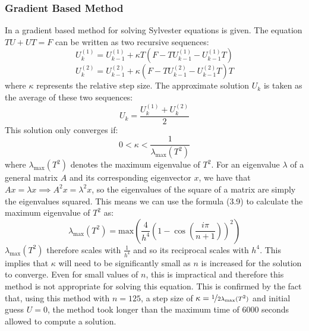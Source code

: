 \documentclass[11pt]{article}
\numberwithin{equation}{section}
\begin{document}
\subsubsection{Gradient Based Method}
In \cite{Zhou} a gradient based method for solving Sylvester equations is given. The equation $TU + UT = F$ can be written as two recursive sequences:
	\begin{equation}
	U_k^{(1)} = U_{k-1}^{(1)} + \kappa T(F-TU_{k-1}^{(1)} - U_{k-1}^{(1)}T)
	\end{equation}
	\begin{equation}
	U_k^{(2)} = U_{k-1}^{(2)} + \kappa (F-TU_{k-1}^{(2)} - U_{k-1}^{(2)}T)T
	\end{equation}
where $\kappa$ represents the relative step size. The approximate solution $U_k$ is taken as the average of these two sequences:
	\begin{equation}
	U_k = \frac{U_k^{(1)} + U_k^{(2)}}{2}
	\end{equation}
This solution only converges if:
	\begin{equation}
	0 < \kappa < \frac{1}{\lambda_{\text{max}}(T^2)} 
	\end{equation}
where $\lambda_{\text{max}}(T^2)$ denotes the maximum eigenvalue of $T^2$. For an eigenvalue $\lambda$ of a general matrix $A$ and its corresponding eigenvector $x$, we have that $Ax = \lambda x \implies A^2 x = \lambda^2 x$, so the eigenvalues of the square of a matrix are simply the eigenvalues squared. This means we can use the formula (3.9) to calculate the maximum eigenvalue of $T^2$ as:
\begin{equation}
\lambda_{\text{max}}(T^2) = \text{max} \left( \frac{4}{h^4}  \left( 1 - \cos \left(\frac{i \pi}{n+1} \right) \right)^2 \right)
\end{equation}
$\lambda_{\text{max}}(T^2)$ therefore scales with $\frac{1}{h^4}$ and so its reciprocal scales with $h^4$. This implies that $\kappa$ will need to be significantly small as $n$ is increased for the solution to converge. Even for small values of $n$, this is impractical and therefore this method is not appropriate for solving this equation. This is confirmed by the fact that, using this method with $n=125$, a step size of $\kappa = \nicefrac{1}{2 \lambda_{\text{max}}(T^2)}$ and initial guess $U=0$, the method took longer than the maximum time of 6000 seconds allowed to compute a solution.
\end{document}
